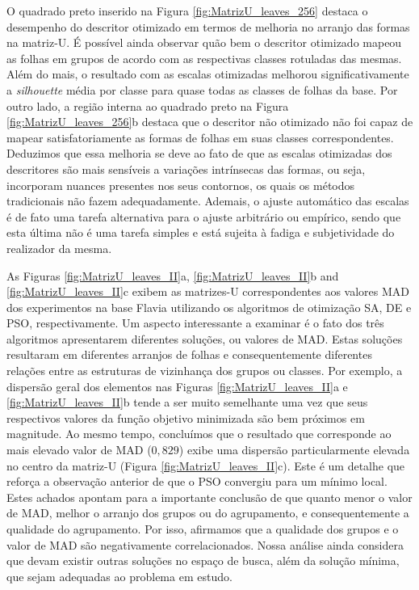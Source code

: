 O quadrado preto inserido na Figura \ref{fig:MatrizU_leaves_256} destaca o desempenho do descritor otimizado em termos de melhoria no arranjo das formas na matriz-U. É possível ainda observar quão bem o descritor otimizado mapeou as folhas em grupos de acordo com as respectivas classes rotuladas das mesmas.  Além do mais, o resultado com as escalas otimizadas melhorou significativamente a \emph{silhouette} média por classe para quase todas as classes de folhas da base. Por outro lado, a região interna ao quadrado preto na Figura \ref{fig:MatrizU_leaves_256}b destaca que o descritor não otimizado não foi capaz de mapear satisfatoriamente as formas de  folhas em suas classes correspondentes. Deduzimos que essa melhoria se deve ao fato de que as escalas otimizadas dos descritores são mais sensíveis a variações intrínsecas das formas, ou seja, incorporam nuances presentes nos seus contornos, os quais os métodos tradicionais não fazem adequadamente. Ademais, o ajuste automático das escalas é de fato uma tarefa alternativa para o ajuste arbitrário ou empírico, sendo que esta última não é uma tarefa simples e está sujeita à fadiga e subjetividade do realizador da mesma.


As Figuras \ref{fig:MatrizU_leaves_II}a, \ref{fig:MatrizU_leaves_II}b and \ref{fig:MatrizU_leaves_II}c exibem as matrizes-U correspondentes aos valores \gls{MAD} dos experimentos na base Flavia utilizando os algoritmos de otimização \gls{SA}, \gls{DE} e \gls{PSO}, respectivamente. Um aspecto interessante a examinar é o fato dos três algoritmos apresentarem diferentes soluções, ou valores de \gls{MAD}. Estas soluções resultaram em diferentes arranjos de folhas e consequentemente diferentes relações entre as estruturas de vizinhança dos grupos ou classes.
Por exemplo, a dispersão geral dos elementos nas Figuras \ref{fig:MatrizU_leaves_II}a e \ref{fig:MatrizU_leaves_II}b tende a ser muito semelhante uma vez que seus respectivos valores da função objetivo minimizada são bem próximos em magnitude. Ao mesmo tempo, concluímos que o resultado que corresponde ao mais elevado valor de \gls{MAD} ($0,829$) exibe uma dispersão particularmente elevada no centro da matriz-U (Figura \ref{fig:MatrizU_leaves_II}c). Este é um detalhe que reforça a observação anterior de que o \gls{PSO} convergiu para um mínimo local. 
Estes achados apontam para a importante conclusão de que quanto menor o valor de \gls{MAD}, melhor o arranjo dos grupos ou do agrupamento, e consequentemente a qualidade do agrupamento. Por isso, afirmamos que a qualidade dos grupos e o valor de \gls{MAD} são negativamente correlacionados. Nossa análise ainda considera que devam existir outras soluções no espaço de busca, além da solução mínima, que sejam adequadas ao problema em estudo.

